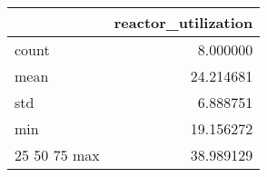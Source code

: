 \begin{tabular}{lr}
\toprule
 & reactor\_utilization \\
\midrule
count & 8.000000 \\
mean & 24.214681 \\
std & 6.888751 \\
min & 19.156272 \\
25%
50%
75%
max & 38.989129 \\
\bottomrule
\end{tabular}

